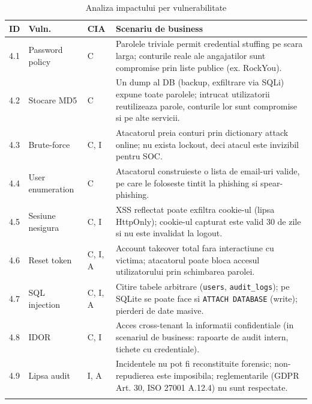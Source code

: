 \documentclass[12pt,a4paper]{article}
\begin{document}
\begin{longtable}{p{} p{} p{} p{}}
\toprule
\textbf{ID} & \textbf{Vuln.} & \textbf{CIA} & \textbf{Scenariu de business} \\
\midrule
4.1 & Password policy & C & Parolele triviale permit credential stuffing pe scara larga; conturile reale ale angajatilor sunt compromise prin liste publice (ex. RockYou). \\
4.2 & Stocare MD5 & C & Un dump al DB (backup, exfiltrare via SQLi) expune toate parolele; intrucat utilizatorii reutilizeaza parole, conturile lor sunt compromise si pe alte servicii. \\
4.3 & Brute-force & C, I & Atacatorul preia conturi prin dictionary attack online; nu exista lockout, deci atacul este invizibil pentru SOC. \\
4.4 & User enumeration & C & Atacatorul construieste o lista de email-uri valide, pe care le foloseste tintit la phishing si spear-phishing. \\
4.5 & Sesiune nesigura & C, I & XSS reflectat poate exfiltra cookie-ul (lipsa HttpOnly); cookie-ul capturat este valid 30 de zile si nu este invalidat la logout. \\
4.6 & Reset token & C, I, A & Account takeover total fara interactiune cu victima; atacatorul poate bloca accesul utilizatorului prin schimbarea parolei. \\
4.7 & SQL injection & C, I, A & Citire tabele arbitrare (\texttt{users}, \texttt{audit\_logs}); pe SQLite se poate face si \texttt{ATTACH DATABASE} (write); pierderi de date masive. \\
4.8 & IDOR & C, I & Acces cross-tenant la informatii confidentiale (in scenariul de business: rapoarte de audit intern, tichete cu credentiale). \\
4.9 & Lipsa audit & I, A & Incidentele nu pot fi reconstituite forensic; non-repudierea este imposibila; reglementarile (GDPR Art. 30, ISO 27001 A.12.4) nu sunt respectate. \\
\bottomrule
\caption{Analiza impactului per vulnerabilitate}
\label{tab:impact}
\end{longtable}
\end{document}
